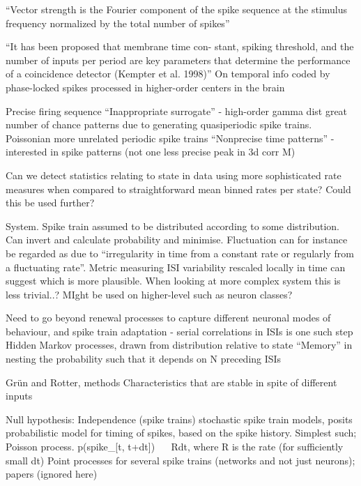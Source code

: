 \documentclass[mphil,deptreport,ai]{infthesis} %
\begin{document}
“Vector strength is the Fourier component of the spike sequence at the stimulus frequency normalized by the total number of spikes”

“It has been proposed that membrane time con- stant, spiking threshold, and the number of inputs per period are key parameters that determine the performance of a coincidence detector (Kempter et al. 1998)”
On temporal info coded by phase-locked spikes processed in higher-order centers in the brain

Precise firing sequence
“Inappropriate surrogate” - high-order gamma dist great number of chance patterns due to generating quasiperiodic spike trains. Poissonian more unrelated periodic spike trains
“Nonprecise time patterns” - interested in spike patterns (not one less precise peak in 3d corr M)


Can we detect statistics relating to state in data using more sophisticated rate measures when compared to straightforward mean binned rates per state? Could this be used further?

System. Spike train assumed to be distributed according to some distribution. Can invert and calculate probability and minimise. Fluctuation can for instance be regarded as due to “irregularity in time from a constant rate or regularly from a fluctuating rate”.
Metric measuring ISI variability rescaled locally in time can suggest which is more plausible.
When looking at more complex system this is less trivial..? MIght be used on higher-level such as neuron classes?

Need to go beyond renewal processes to capture different neuronal modes of behaviour, and spike train adaptation - serial correlations in ISIs is one such step
Hidden Markov processes, drawn from distribution relative to state
“Memory” in nesting the probability such that it depends on N preceding ISIs

Grün and Rotter, methods
Characteristics that are stable in spite of different inputs

Null hypothesis: Independence (spike trains)
stochastic spike train models, posits probabilistic model for timing of spikes, based on the spike history. Simplest such; Poisson process.
p(spike\_[t, t+dt]) ~~ Rdt, where R is the rate (for sufficiently small dt)
Point processes for several spike trains (networks and not just neurons); papers (ignored here)
\end{document}
